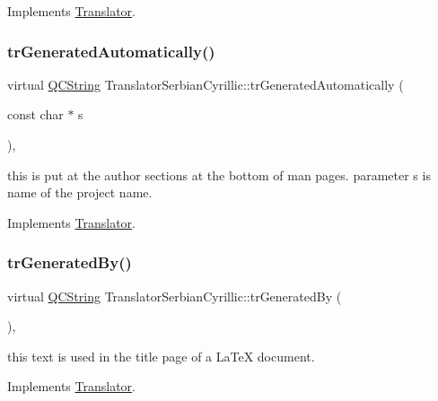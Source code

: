 Implements \mbox{\hyperlink{class_translator}{Translator}}.

\mbox{\label{class_translator_serbian_cyrillic_a4f58225ab4b28fa0105e4a10a3fdb87c}} 
\subsubsection{\texorpdfstring{trGeneratedAutomatically()}{trGeneratedAutomatically()}}
{\footnotesize\ttfamily virtual \mbox{\hyperlink{class_q_c_string}{Q\+C\+String}} Translator\+Serbian\+Cyrillic\+::tr\+Generated\+Automatically (\begin{DoxyParamCaption}\item[{const char $\ast$}]{s }\end{DoxyParamCaption})\hspace{0.3cm}{\ttfamily [inline]}, {\ttfamily [virtual]}}

this is put at the author sections at the bottom of man pages. parameter s is name of the project name. 

Implements \mbox{\hyperlink{class_translator}{Translator}}.

\mbox{\label{class_translator_serbian_cyrillic_a52e7248dac2ad31ca3f5bb4808ea6fdc}} 
\subsubsection{\texorpdfstring{trGeneratedBy()}{trGeneratedBy()}}
{\footnotesize\ttfamily virtual \mbox{\hyperlink{class_q_c_string}{Q\+C\+String}} Translator\+Serbian\+Cyrillic\+::tr\+Generated\+By (\begin{DoxyParamCaption}{ }\end{DoxyParamCaption})\hspace{0.3cm}{\ttfamily [inline]}, {\ttfamily [virtual]}}

this text is used in the title page of a La\+TeX document. 

Implements \mbox{\hyperlink{class_translator}{Translator}}.


